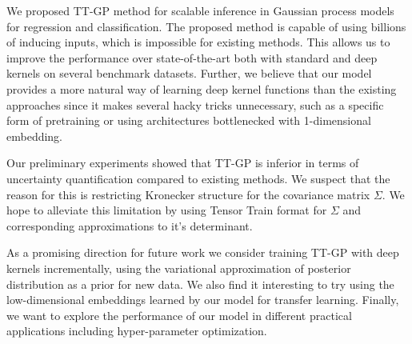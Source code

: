 We proposed TT-GP method for scalable inference in Gaussian process models
for regression and classification.  The proposed method is capable of using
billions of inducing inputs, which is impossible for existing methods. This allows us to improve the
performance over state-of-the-art both with standard and deep kernels
on several benchmark datasets.
Further, we believe that our model provides a more natural way of learning deep
kernel functions than the existing approaches since it makes several hacky tricks
unnecessary, such as a specific form of pretraining or using architectures
bottlenecked with 1-dimensional embedding.

Our preliminary experiments showed that TT-GP is inferior in terms of
uncertainty quantification compared to existing methods. We suspect that the
reason for this is restricting Kronecker structure for the covariance matrix $\Sigma$. We hope to
alleviate this limitation by using Tensor Train format for $\Sigma$ and corresponding approximations to it's determinant.

As a promising direction for future work we consider training TT-GP
with deep kernels incrementally, using the variational approximation
of posterior distribution as a prior for new data. We also find it interesting
to try using the low-dimensional embeddings learned by our model for transfer learning. Finally, we want to
explore the performance of our model in different practical applications including hyper-parameter optimization.
